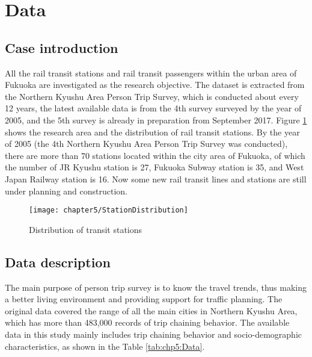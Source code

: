 %
\section{Data}
%
\subsection{Case introduction}
All the rail transit stations and rail transit passengers within the urban area of Fukuoka are investigated as the research objective. The dataset is extracted from the Northern Kyushu Area Person Trip Survey, which is conducted about every 12 years, the latest available data is from the 4th survey surveyed by the year of 2005, and the 5th survey is already in preparation from September 2017. Figure \ref{fig:chp5:StationDistribution} shows the research area and the distribution of rail transit stations. By the year of 2005 (the 4th Northern Kyushu Area Person Trip Survey was conducted), there are more than 70 stations located within the city area of Fukuoka, of which the number of JR Kyushu station is 27, Fukuoka Subway station is 35, and West Japan Railway station is 16. Now some new rail transit lines and stations are still under planning and construction. 

\begin{figure}[htbp]
	\centering
	\texttt{[image: chapter5/StationDistribution]}
	\caption{Distribution of transit stations}
	\label{fig:chp5:StationDistribution}
\end{figure}

%
\subsection{Data description}
The main purpose of person trip survey is to know the travel trends, thus making a better living environment and providing support for traffic planning. The original data covered the range of all the main cities in Northern Kyushu Area, which has more than 483,000 records of trip chaining behavior. The available data in this study mainly includes trip chaining behavior and socio-demographic characteristics, as shown in the Table \ref{tab:chp5:Data}.

